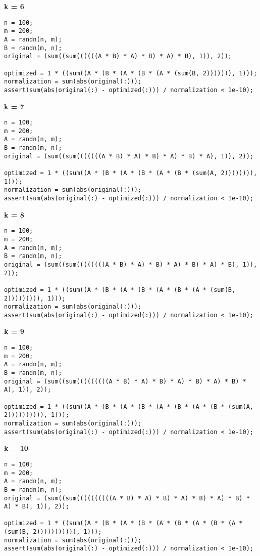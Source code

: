 {\bf k = 6}

\begin{lstlisting}
n = 100;
m = 200;
A = randn(n, m);
B = randn(m, n);
original = (sum((sum((((((A * B) * A) * B) * A) * B), 1)), 2));

optimized = 1 * ((sum((A * (B * (A * (B * (A * (sum(B, 2))))))), 1)));
normalization = sum(abs(original(:)));
assert(sum(abs(original(:) - optimized(:))) / normalization < 1e-10);
\end{lstlisting}


{\bf k = 7}

\begin{lstlisting}
n = 100;
m = 200;
A = randn(n, m);
B = randn(m, n);
original = (sum((sum(((((((A * B) * A) * B) * A) * B) * A), 1)), 2));

optimized = 1 * ((sum((A * (B * (A * (B * (A * (B * (sum(A, 2)))))))), 1)));
normalization = sum(abs(original(:)));
assert(sum(abs(original(:) - optimized(:))) / normalization < 1e-10);
\end{lstlisting}


{\bf k = 8}

\begin{lstlisting}
n = 100;
m = 200;
A = randn(n, m);
B = randn(m, n);
original = (sum((sum((((((((A * B) * A) * B) * A) * B) * A) * B), 1)), 2));

optimized = 1 * ((sum((A * (B * (A * (B * (A * (B * (A * (sum(B, 2))))))))), 1)));
normalization = sum(abs(original(:)));
assert(sum(abs(original(:) - optimized(:))) / normalization < 1e-10);
\end{lstlisting}


{\bf k = 9}

\begin{lstlisting}
n = 100;
m = 200;
A = randn(n, m);
B = randn(m, n);
original = (sum((sum(((((((((A * B) * A) * B) * A) * B) * A) * B) * A), 1)), 2));

optimized = 1 * ((sum((A * (B * (A * (B * (A * (B * (A * (B * (sum(A, 2)))))))))), 1)));
normalization = sum(abs(original(:)));
assert(sum(abs(original(:) - optimized(:))) / normalization < 1e-10);
\end{lstlisting}


{\bf k = 10}

\begin{lstlisting}
n = 100;
m = 200;
A = randn(n, m);
B = randn(m, n);
original = (sum((sum((((((((((A * B) * A) * B) * A) * B) * A) * B) * A) * B), 1)), 2));

optimized = 1 * ((sum((A * (B * (A * (B * (A * (B * (A * (B * (A * (sum(B, 2))))))))))), 1)));
normalization = sum(abs(original(:)));
assert(sum(abs(original(:) - optimized(:))) / normalization < 1e-10);
\end{lstlisting}


